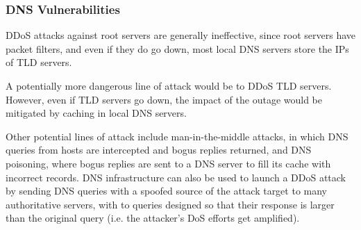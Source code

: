 \documentclass[12pt,titlepage]{article}
\begin{document}
    \subsubsection{DNS Vulnerabilities}
      DDoS attacks against root servers are generally ineffective, since root servers have packet filters, and even if they do go down, most local DNS servers store the IPs of
      TLD servers.

      A potentially more dangerous line of attack would be to DDoS TLD servers. However, even if TLD servers go down, the impact of the outage would be mitigated
      by caching in local DNS servers.

      Other potential lines of attack include man-in-the-middle attacks, in which DNS queries from hosts are intercepted and bogus replies returned,
      and DNS poisoning, where bogus replies are sent to a DNS server to fill its cache with incorrect records. DNS infrastructure can also be used to launch a DDoS attack by sending
      DNS queries with a spoofed source of the attack target to many authoritative servers, with to queries designed so that their response is larger than the original query (i.e. the
      attacker's DoS efforts get amplified).
\end{document}
